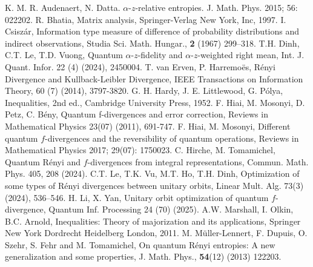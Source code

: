 \documentclass[10pt,reqno]{amsart}
\theoremstyle{break-italic}
\theoremstyle{break-italic}
\theoremstyle{break-italic}
\theoremstyle{break-italic}
\theoremstyle{break-italic}
\theoremstyle{break-italic}
\theoremstyle{break-italic}
\theoremstyle{break-italic}
\theoremstyle{break-roman}
\theoremstyle{standard}
\theoremstyle{varthm-roman}
\theoremstyle{varthm-italic}
\theoremstyle{varthm-roman-break}
\theoremstyle{varthm-italic-break}
\theoremstyle{varthm-roman-no-punctuation}
\theoremstyle{varthm-italic-no-punctuation}
\numberwithin{equation}{section}
\begin{document}
\begin{thebibliography}{}

 K. M. R. Audenaert, N. Datta. $\alpha$-$z$-relative entropies. J. Math. Phys. 2015; 56: 022202.
 R. Bhatia, Matrix analysis, Springer-Verlag New York, Inc, 1997.
 I. Csisz\'ar, Information type measure of difference of probability distributions and indirect observations, Studia Sci. Math. Hungar.,\textbf{ 2 }(1967) 299–318.
 T.H. Dinh, C.T. Le, T.D. Vuong, Quantum $\alpha$-$z$-fidelity and $\alpha$-$z$-weighted right mean, Int. J. Quant. Infor. 22 (4) (2024), 2450004.
 T. van Erven, P. Harremo\"es, R\'enyi Divergence and Kullback-Leibler Divergence, IEEE Transactions on Information Theory, 60 (7) (2014), 3797-3820.
 G. H. Hardy, J. E. Littlewood, G. P\'olya, Inequalities, 2nd ed., Cambridge University Press, 1952.
 F. Hiai, M. Mosonyi, D. Petz, C. B\'eny,   Quantum f-divergences and error correction, Reviews in Mathematical Physics  23(07) (2011), 691-747.
 F. Hiai, M. Mosonyi,  Different quantum $f$-divergences and the reversibility of quantum operations,  Reviews in Mathematical Physics 2017; 29(07): 1750023.
 C. Hirche,  M. Tomamichel, Quantum R\'enyi and $f$-divergences from integral representations, Commun. Math. Phys. 405, 208 (2024).
 C.T. Le,  T.K. Vu, M.T. Ho, T.H. Dinh, Optimization of some types of Rényi divergences between unitary orbits, Linear Mult. Alg. 73(3) (2024), 536–546.
 H. Li, X. Yan, Unitary orbit optimization of quantum $f$-divergence, Quantum Inf. Processing 24 (70) (2025).%
 A.W. Marshall, I. Olkin, B.C. Arnold, Inequalities: Theory of majorization and its applications, Springer New York Dordrecht Heidelberg London, 2011.
 M. M\"uller-Lennert, F. Dupuis, O. Szehr, S. Fehr and M. Tomamichel, On quantum Rényi entropies: A new generalization and some properties, J. Math. Phys., \textbf{54}(12) (2013) 122203.

\end{thebibliography}
\end{document}
